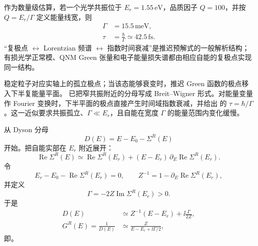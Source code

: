 \begin{exbox}
作为数量级估算，若一个光学共振位于 $E_r=1.55\,\mathrm{eV}$，品质因子 $Q=100$，并按 $Q=E_r/\Gamma$ 定义能量线宽，则
\begin{align*}
 \Gamma&=15.5\,\mathrm{meV},\\
 \tau&=\frac{\hbar}{\Gamma}
 \simeq42.5\,\mathrm{fs}.
\end{align*}
“复极点 $\leftrightarrow$ Lorentzian 频谱 $\leftrightarrow$ 指数时间衰减”是推迟预解式的一般解析结构；有损光学正常模、QNM Green 张量和电子能量损失谱都由相应自能的复极点实现同一结构。


\medskip

稳定粒子对应实轴上的孤立极点；当该态能够衰变时，推迟 Green 函数的极点移入下半复能量平面。 已把窄共振附近的分母写成 Breit--Wigner 形式。对能量变量作 Fourier 变换时，下半平面的极点直接产生时间域指数衰减，并给出 的 $\tau=\hbar/\Gamma$。这一近似要求共振孤立、$\Gamma\ll E_r$，且自能在宽度 $\Gamma$ 的能量范围内变化缓慢。


从 Dyson 分母
\begin{equation*}
 D(E)=E-E_0-\Sigma^R(E)
\end{equation*}
开始。把自能实部在 $E_r$ 附近展开：
\begin{equation*}
 \operatorname{Re}\Sigma^R(E)
 \simeq \operatorname{Re}\Sigma^R(E_r)
 +(E-E_r)\,\partial_E\operatorname{Re}\Sigma^R(E_r).
\end{equation*}
令
\begin{equation*}
 E_r-E_0-\operatorname{Re}\Sigma^R(E_r)=0,
 \qquad
 Z^{-1}=1-\partial_E\operatorname{Re}\Sigma^R(E_r),
\end{equation*}
并定义
\begin{equation*}
 \Gamma=-2Z\operatorname{Im}\Sigma^R(E_r)>0.
\end{equation*}
于是
\begin{align*}
 D(E)
 &\simeq Z^{-1}(E-E_r)+\ii\frac{\Gamma}{2Z},\\
 G^R(E)=\frac1{D(E)}
 &\simeq\frac{Z}{E-E_r+\ii\Gamma/2},
\end{align*}
即。


\end{exbox}
